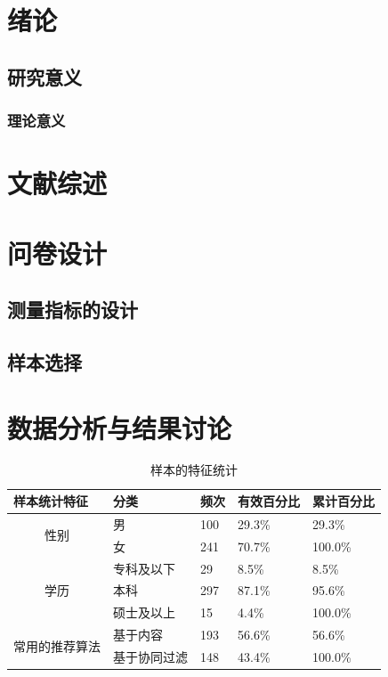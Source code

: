 \documentclass[12pt,UTF8]{ctexart}
\begin{document}
\begin{spacing}{1.25}
\section{绪论}
\subsection{研究意义}
\subsubsection{理论意义}
\setcounter{table}{0}
\setcounter{figure}{0}
\section{文献综述}
\setcounter{table}{0}
\setcounter{figure}{0}
\section{问卷设计}
\subsection{测量指标的设计}
\subsection{样本选择}
\setcounter{table}{0}
\setcounter{figure}{0}
\section{数据分析与结果讨论}

\begin{table}[H]
\centering
\caption{样本的特征统计}
\label{tab:ybtj}
\begin{tabular}{@{}cllll@{}}
\toprule
\multicolumn{1}{l}{\textbf{样本统计特征}}          & \textbf{分类} & \textbf{频次} & \textbf{有效百分比} & \textbf{累计百分比} \\ \midrule
\multirow{2}{*}{性别}                          & 男           & 100         & 29.3\%         & 29.3\%         \\
                                             & 女           & 241         & 70.7\%         & 100.0\%        \\ \midrule
\multirow{3}{*}{学历}                          & 专科及以下       & 29          & 8.5\%          & 8.5\%          \\
                                             & 本科          & 297         & 87.1\%         & 95.6\%         \\
                                             & 硕士及以上       & 15          & 4.4\%          & 100.0\%        \\ \midrule
\multicolumn{1}{l}{\multirow{2}{*}{常用的推荐算法}} & 基于内容        & 193         & 56.6\%         & 56.6\%         \\
\multicolumn{1}{l}{}                         & 基于协同过滤      & 148         & 43.4\%         & 100.0\%        \\ \bottomrule
\end{tabular}
\end{table}



\end{spacing}
\end{document}
